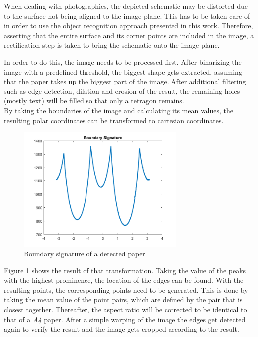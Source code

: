 \documentclass[10pt,twocolumn,letterpaper]{article}
\begin{document}
When dealing with photographies, the depicted schematic may be distorted due to the surface not being aligned to the image plane. This has to be taken care of in order to use the object recognition approach presented in this work. Therefore, asserting that the entire surface and its corner points are included in the image, a rectification step is taken to bring the schematic onto the image plane.
\par

In order to do this, the image needs to be processed first. After binarizing the image with a predefined threshold, the biggest shape gets extracted, assuming that the paper takes up the biggest part of the image. After additional filtering such as edge detection, dilation and erosion of the result, the remaining holes (mostly text) will be filled so that only a tetragon remains.\\
By taking the boundaries of the image and calculating its mean values, the resulting polar coordinates can be transformed to cartesian coordinates.

\begin{figure}[!ht]
\includegraphics[width = 3.2in]{img/sig.png}
\caption{Boundary signature of a detected paper}
\label{fig:sig}
\end{figure}

Figure \ref{fig:sig} shows the result of that transformation. Taking the value of the peaks with the highest prominence, the location of the edges can be found. With the resulting points, the corresponding points need to be generated. This is done by taking the mean value of the point pairs, which are defined by the pair that is closest together. Thereafter, the aspect ratio will be corrected to be identical to that of a \textit{A4} paper. After a simple warping of the image the edges get detected again to verify the result and the image gets cropped according to the result.

\par
\end{document}
